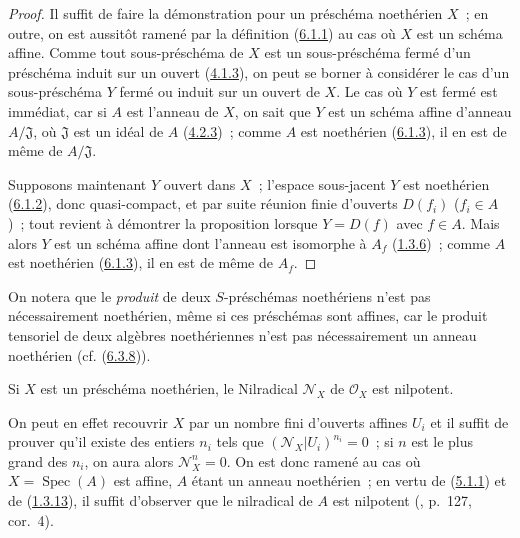 \begin{proof}
Il suffit de faire la démonstration pour un préschéma noethérien $X$~; en
outre, on est aussitôt ramené par la définition
(\hyperref[I.6.1.1-fr]{6.1.1}) au cas où $X$ est un schéma affine. Comme tout
sous-préschéma de $X$ est un sous-préschéma fermé d'un préschéma induit sur
un ouvert (\hyperref[I.4.1.3-fr]{4.1.3}), on peut se borner à considérer le
cas d'un sous-préschéma $Y$ fermé ou induit sur un ouvert de $X$. Le cas où
$Y$ est fermé est immédiat, car si $A$ est l'anneau de $X$, on sait que $Y$
est un schéma affine d'anneau $A/\mathfrak{J}$, où $\mathfrak{J}$ est un
idéal de $A$ (\hyperref[I.4.2.3-fr]{4.2.3})~; comme $A$ est noethérien
(\hyperref[I.6.1.3-fr]{6.1.3}), il en est de même de $A/\mathfrak{J}$.

Supposons maintenant $Y$ ouvert dans $X$~; l'espace sous-jacent $Y$ est
noethérien (\hyperref[I.6.1.2-fr]{6.1.2}), donc quasi-compact, et par suite
réunion finie d'ouverts $D(f_i)$ ($f_i\in A$)~;
tout revient à démontrer la proposition lorsque $Y=D(f)$ avec $f\in A$. Mais
alors $Y$ est un schéma affine dont l'anneau est isomorphe à $A_f$
(\hyperref[I.1.3.6-fr]{1.3.6})~; comme $A$ est noethérien
(\hyperref[I.6.1.3-fr]{6.1.3}), il en est de même de $A_f$.
\end{proof}

\begin{env}[6.1.5]
\label{I.6.1.5-fr}
On notera que le \emph{produit} de deux $S$-préschémas noethériens n'est pas
nécessairement noethérien, même si ces préschémas sont affines, car le produit
tensoriel de deux algèbres noethériennes n'est pas nécessairement un anneau
noethérien (cf. (\hyperref[I.6.3.8-fr]{6.3.8})).
\end{env}

\begin{proposition}[6.1.6]
\label{I.6.1.6-fr}
Si $X$ est un préschéma noethérien, le Nilradical $\mathscr{N}_X$ de
$\mathscr{O}_X$ est nilpotent.
\end{proposition}

On peut en effet recouvrir $X$ par un nombre fini d'ouverts affines $U_i$ et il
suffit de prouver qu'il existe des entiers $n_i$ tels que
$(\mathscr{N}_X|U_i)^{n_i}=0$~; si $n$ est le plus grand des $n_i$, on aura
alors $\mathscr{N}_X^n=0$. On est donc ramené au cas où
$X=\operatorname{Spec}(A)$ est affine, $A$ étant un anneau noethérien~; en
vertu de (\hyperref[I.5.1.1-fr]{5.1.1}) et de
(\hyperref[I.1.3.13-fr]{1.3.13}), il suffit d'observer que le nilradical de
$A$ est nilpotent (\cite{I-11}, p.~127, cor.~4).

